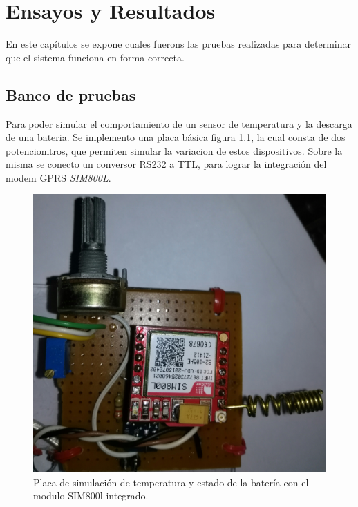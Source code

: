 \chapter{Ensayos y Resultados} %
En este capítulos se expone cuales fuerons las pruebas realizadas para determinar que el sistema funciona en forma correcta.
\label{Chapter4} %

\section{Banco de pruebas}
Para poder simular el comportamiento de un sensor de temperatura y la descarga de una bateria. Se implemento una placa básica figura \ref{fig:placa_básica}, la cual consta de dos potenciomtros, que permiten simular la variacion de estos dispositivos. Sobre la misma se conecto un conversor RS232 a TTL, para lograr la integración del modem GPRS \emph{SIM800L}.

\begin{figure}[h]
  \centering
  \includegraphics[scale=.03]{./Figures/placa_basica.jpg}
  \caption{Placa de simulación de temperatura y estado de la batería con el modulo SIM800l integrado.}
  \label{fig:placa_básica}
\end{figure}


